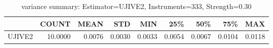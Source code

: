 \begin{table}[ht]
\centering
\caption{variance summary: Estimator=UJIVE2, Instruments=333, Strength=0.30}
\begin{tabular}{lrrrrrrrr}
\toprule
 & COUNT & MEAN & STD & MIN & 25\% & 50\% & 75\% & MAX \\
\midrule
UJIVE2 & 10.0000 & 0.0076 & 0.0030 & 0.0033 & 0.0054 & 0.0067 & 0.0104 & 0.0118 \\
\bottomrule
\end{tabular}
\end{table}
